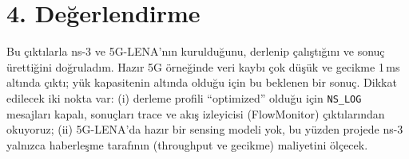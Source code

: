 \documentclass[10pt,a4paper]{article}
\begin{document}
\section*{4. Değerlendirme}
Bu çıktılarla ns-3 ve 5G-LENA'nın kurulduğunu, derlenip çalıştığını ve sonuç ürettiğini doğruladım. Hazır 5G örneğinde veri kaybı çok düşük ve gecikme 1\,ms altında çıktı; yük kapasitenin altında olduğu için bu beklenen bir sonuç. Dikkat edilecek iki nokta var: (i) derleme profili ``optimized'' olduğu için \texttt{NS\_LOG} mesajları kapalı, sonuçları trace ve akış izleyicisi (FlowMonitor) çıktılarından okuyoruz; (ii) 5G-LENA'da hazır bir sensing modeli yok, bu yüzden projede ns-3 yalnızca haberleşme tarafının (throughput ve gecikme) maliyetini ölçecek.
\end{document}
